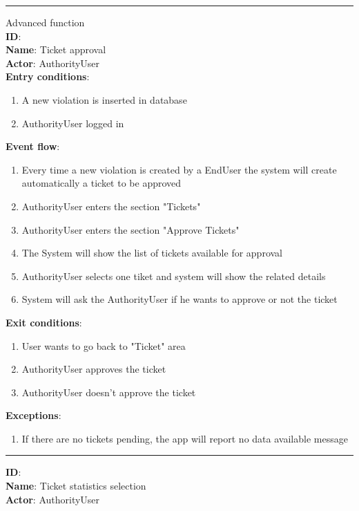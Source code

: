   \rule{\linewidth}{0.4pt}
\item{Advanced function}\\
		\textbf{ID}:  \\
		\textbf{Name}: Ticket approval  \\
		\textbf{Actor}: AuthorityUser   \\
		\textbf{Entry conditions}:
		\begin{enumerate}
			\item{A new violation is inserted in database}
      \item{AuthorityUser logged in}
		\end{enumerate}
		\textbf{Event flow}:
		\begin{enumerate}
      \item{Every time a new violation is created by a EndUser the system will create automatically a ticket to be approved}
			\item{AuthorityUser enters the section "Tickets"}
			\item{AuthorityUser enters the section "Approve Tickets"}
      \item{The System will show the list of tickets available for approval }
      \item{AuthorityUser selects one tiket and system will show the related details}
      \item{System will ask the AuthorityUser if he wants to approve or not the ticket}
  		\end{enumerate}
		\textbf{Exit conditions}:
    \begin{enumerate}
      \item{User wants to go back to "Ticket" area}
      \item{AuthorityUser approves the ticket}
      \item{AuthorityUser doesn't approve the ticket}
    \end{enumerate}
		\textbf{Exceptions}:
		\begin{enumerate}
			\item{If there are no tickets pending, the app will report no data available message}
		\end{enumerate}
		\rule{\linewidth}{0.4pt}
    \textbf{ID}:  \\
    \textbf{Name}: Ticket statistics selection \\
    \textbf{Actor}: AuthorityUser   \\
